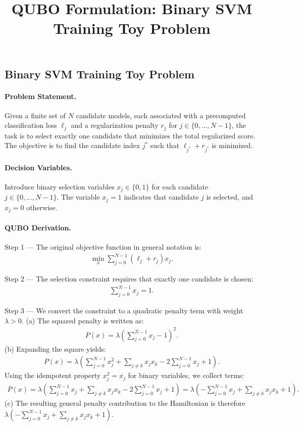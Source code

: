 \documentclass[12pt]{article}
\title{QUBO Formulation: Binary SVM Training Toy Problem}
\date{}
\begin{document}
\maketitle

\subsection*{Binary SVM Training Toy Problem}

\paragraph{Problem Statement.}
Given a finite set of $N$ candidate models, each associated with a precomputed classification loss $\ell_j$ and a regularization penalty $r_j$ for $j \in \{0, \dots, N-1\}$, the task is to select exactly one candidate that minimizes the total regularized score. The objective is to find the candidate index $j^*$ such that $\ell_{j^*} + r_{j^*}$ is minimized.

\paragraph{Decision Variables.}
Introduce binary selection variables $x_j \in \{0,1\}$ for each candidate $j \in \{0, \dots, N-1\}$. The variable $x_j = 1$ indicates that candidate $j$ is selected, and $x_j = 0$ otherwise.

\paragraph{QUBO Derivation.}
Step 1 --- The original objective function in general notation is:
\begin{align}
\min_{x} \sum_{j=0}^{N-1} (\ell_j + r_j) x_j.
\end{align}

Step 2 --- The selection constraint requires that exactly one candidate is chosen:
\begin{align}
\sum_{j=0}^{N-1} x_j = 1.
\end{align}

Step 3 --- We convert the constraint to a quadratic penalty term with weight $\lambda > 0$. 
(a) The squared penalty is written as:
\begin{align}
P(x) = \lambda \left( \sum_{j=0}^{N-1} x_j - 1 \right)^2.
\end{align}
(b) Expanding the square yields:
\begin{align}
P(x) = \lambda \left( \sum_{j=0}^{N-1} x_j^2 + \sum_{j \neq k} x_j x_k - 2 \sum_{j=0}^{N-1} x_j + 1 \right).
\end{align}
Using the idempotent property $x_j^2 = x_j$ for binary variables, we collect terms:
\begin{align}
P(x) = \lambda \left( \sum_{j=0}^{N-1} x_j + \sum_{j \neq k} x_j x_k - 2 \sum_{j=0}^{N-1} x_j + 1 \right) = \lambda \left( -\sum_{j=0}^{N-1} x_j + \sum_{j \neq k} x_j x_k + 1 \right).
\end{align}
(c) The resulting general penalty contribution to the Hamiltonian is therefore $\lambda \left( -\sum_{j=0}^{N-1} x_j + \sum_{j \neq k} x_j x_k + 1 \right)$.
\end{document}
